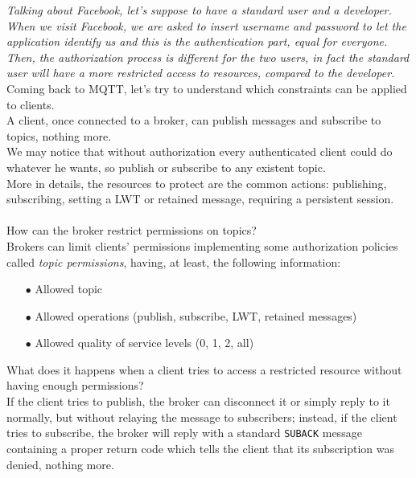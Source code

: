 \documentclass[12pt]{report}
\begin{document}
{{\emph{Talking about Facebook, let's suppose to have a standard user and a developer.
When we visit Facebook, we are asked to insert username and password to let the application identify us and this is the authentication part, equal for everyone.
Then, the authorization process is different for the two users, in fact the standard user will have a more restricted access to resources, compared to the developer.}\\

Coming back to MQTT, let's try to understand which constraints can be applied to clients.\\
A client, once connected to a broker, can publish messages and subscribe to topics, nothing more.\\
We may notice that without authorization every authenticated client could do whatever he wants, so publish or subscribe to any existent topic.\\
More in details, the resources to protect are the common actions: publishing, subscribing, setting a LWT or retained message, requiring a persistent session.\\\\
How can the broker restrict permissions on topics?\\

Brokers can limit clients' permissions implementing some authorization policies called \emph{topic permissions}, having, at least, the following information:

\begin{itemize}
\setlength{\itemindent}{+4mm}
  \item[$\bullet$] Allowed topic
  \item[$\bullet$] Allowed operations (publish, subscribe, LWT, retained messages)
  \item[$\bullet$] Allowed quality of service levels (0, 1, 2, all)
\end{itemize}

What does it happens when a client tries to access a restricted resource without having enough permissions?\\

If the client tries to publish, the broker can disconnect it or simply reply to it normally, but without relaying the message to subscribers; instead, if the client tries to subscribe, the broker will reply with a standard \texttt{SUBACK} message containing a proper return code which tells the client that its subscription was denied, nothing more.\\

}}
\end{document}
